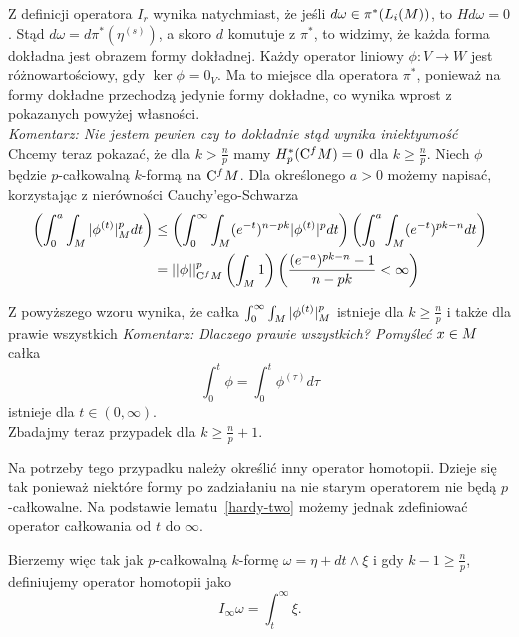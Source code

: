 \documentclass[licencjacka]{pracamgr}
\theoremstyle{definition}
\theoremstyle{definition}
\theoremstyle{plain}
\theoremstyle{plain}
\theoremstyle{plain}
\theoremstyle{plain}
\def\cfm{\ensuremath\mathrm{C}^fM}
\def\M{\ensuremath M}
\begin{document}
Z definicji operatora $I_r$ wynika natychmiast, że jeśli
 $d \omega \in \pi^\ast(L_i(\M))$, to $Hd\omega = 0$.
Stąd $d \omega = d \pi^\ast(\eta^{(s)})$, a skoro $d$ komutuje z $\pi^\ast$,
to widzimy, że każda forma dokładna jest obrazem formy dokładnej. 
Każdy operator liniowy $\phi: V \rightarrow W$ jest różnowartościowy, gdy
$\ker \phi = 0_V$. Ma to miejsce dla operatora $\pi^\ast$, ponieważ
na formy dokładne przechodzą jedynie formy dokładne, co wynika wprost z pokazanych
powyżej własności. \\

\emph{Komentarz: Nie jestem pewien czy to dokładnie stąd wynika iniektywność} \\

Chcemy teraz pokazać, że dla $k > \frac{n}{p}$ mamy $H^\ast_p(\cfm) = 0$ dla
$k \geq \frac{n}{p}$. Niech $\phi$ będzie $p$-całkowalną $k$-formą na
$\cfm$. Dla określonego $a > 0$ możemy napisać, korzystając z nierówności
Cauchy'ego-Schwarza
\begin{align*}
\left(
    \int_0^a \int_\M |\phi^{(t)}|_M^p dt
\right) & \leq 
\left(
    \int_0^\infty \int_\M (e^{-t})^{n-pk} |\phi^{(t)}|^p dt
\right)
\left(
    \int_0^a \int_\M (e^{-t})^{pk-n} dt 
\right) \\
&= 
    ||\phi||_{\cfm}^p 
\left(
    \int_\M 1
\right)
\left(
    \frac{ (e^{-a})^{pk-n} - 1 }{n-pk} < \infty
\right) \\
\end{align*}

Z powyższego wzoru wynika, że całka $\int_0^\infty \int_\M |\phi^{(t)}|_M^p$ 
istnieje dla $k \geq \frac{n}{p}$ i także dla prawie wszystkich
\emph{Komentarz: Dlaczego prawie wszystkich? Pomyśleć}
$x \in \M$ całka
\[
\int_0^t \phi = \int_0^t \phi^{(\tau)} d\tau
\]
istnieje dla $t \in (0, \infty)$. \\



Zbadajmy teraz przypadek dla $k \geq \frac{n}{p} + 1$.

Na potrzeby tego przypadku należy określić inny operator homotopii.
Dzieje się tak ponieważ niektóre formy po zadziałaniu na nie starym operatorem
nie będą $p$-całkowalne. Na podstawie lematu~\ref{hardy-two} możemy
jednak zdefiniować operator całkowania od $t$ do $\infty$.


Bierzemy więc tak jak $p$-całkowalną $k$-formę $\omega = \eta + dt \wedge \xi$
i gdy $k-1 \geq \frac{n}{p}$, definiujemy operator homotopii jako
\[
I_\infty \omega = \int_t^\infty \xi.
\]
\end{document}
